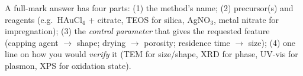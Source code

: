 \begin{tipbox}
A full-mark answer has four parts: (1) the method's name; (2) precursor(s) and reagents (e.g.\ HAuCl$_4$ + citrate,
TEOS for silica, AgNO$_3$, metal nitrate for impregnation); (3) the \emph{control parameter} that gives the requested
feature (capping agent $\to$ shape; drying $\to$ porosity; residence time $\to$ size); (4) one line on how you would
\emph{verify} it (TEM for size/shape, XRD for phase, UV-vis for plasmon, XPS for oxidation state).
\end{tipbox}
